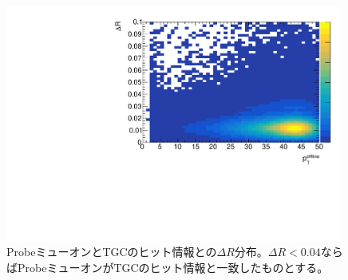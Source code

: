 \begin{figure}[htb]
  \centering
  \includegraphics[clip, width=11cm]{fig/3/dR_probe_RoI.pdf}
  \caption{ProbeミューオンとTGCのヒット情報との$\Delta R$分布。$\Delta R< 0.04$ならばProbeミューオンがTGCのヒット情報と一致したものとする。}
  \label{fig:Probe_TGC}
\end{figure}

